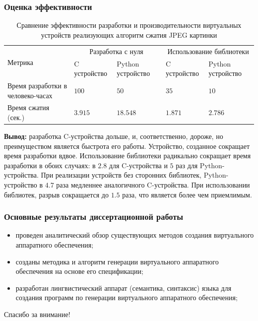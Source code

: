 \begin{frame}%
    \frametitle{Оценка эффективности}
    \small
    \begin{longtable}{| p{2cm} | p{1.5cm} | p{1.5cm} | p{1.5cm} | p{1cm} |}
        \caption{Сравнение эффективности разработки и производительности виртуальных устройств реализующих
                 алгоритм сжатия JPEG картинки} \\
        \hline
            \multirow{2}{*}{Метрика} &
            \multicolumn{2}{c|}{Разработка с нуля} &
            \multicolumn{2}{c|}{Использование библиотеки} \\
        \cline{2-5} &
            C устройство &
            Python устройство &
            C устройство &
            Python устройство \\
        \hline
            Время разработки в человеко-часах &
            $100$ &
            $50$ &
            $35$ &
            $10$ \\
        \hline
            Время сжатия (сек.)&
            $3.915$ &
            $18.548$ &
            $1.871$ &
            $2.786$ \\
        \hline
    \end{longtable}
    {\small
        \textbf{Вывод:} разработка C-устройства дольше, и, соответственно, дороже,
        но преимуществом является быстрота его работы.
        Устройство, созданное {\mylanguage} сокращает время разработки вдвое.
        Использование библиотеки радикально сокращает
        время разработки в обоих случаях: в $2.8$ для C-устройства и
        $5$ раз для Python-устройства.
        При реализации устройств без сторонних библиотек, Python-устройство
        в $4.7$ раза медленнее аналогичного C-устройства. При использовании
        библиотек, разрыв сокращается до $1.5$ раза, что является
        более чем приемлимым.
    }
\end{frame}


\begin{frame}%
    \frametitle{Основные результаты диссертационной работы}
    \begin{itemize}
        \item проведен аналитический обзор существующих методов создания виртуального аппаратного обеспечения;
        \item созданы методика и алгоритм генерации виртуального аппаратного обеспечения на основе его спецификации;
        \item разработан лингвистический аппарат (семантика, синтаксис) языка для создания программ по генерации виртуального
            аппаратного обеспечения;
    \end{itemize}
\end{frame}


\begin{frame}%
    \begin{center}
        \Huge Спасибо за внимание!
    \end{center}
\end{frame}
